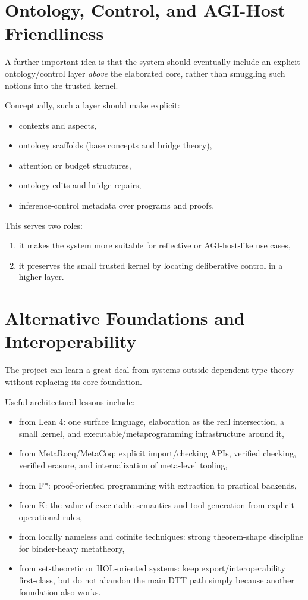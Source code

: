 \documentclass[11pt]{article}
\begin{document}
\section{Ontology, Control, and AGI-Host Friendliness}
A further important idea is that the system should eventually include an explicit ontology/control layer \emph{above} the elaborated core, rather than smuggling such notions into the trusted kernel.

Conceptually, such a layer should make explicit:
\begin{itemize}
  \item contexts and aspects,
  \item ontology scaffolds (base concepts and bridge theory),
  \item attention or budget structures,
  \item ontology edits and bridge repairs,
  \item inference-control metadata over programs and proofs.
\end{itemize}

This serves two roles:
\begin{enumerate}[label=(\roman*)]
  \item it makes the system more suitable for reflective or AGI-host-like use cases,
  \item it preserves the small trusted kernel by locating deliberative control in a higher layer.
\end{enumerate}

\section{Alternative Foundations and Interoperability}
The project can learn a great deal from systems outside dependent type theory without replacing its core foundation.

Useful architectural lessons include:
\begin{itemize}
  \item from Lean 4: one surface language, elaboration as the real intersection, a small kernel, and executable/metaprogramming infrastructure around it,
  \item from MetaRocq/MetaCoq: explicit import/checking APIs, verified checking, verified erasure, and internalization of meta-level tooling,
  \item from F*: proof-oriented programming with extraction to practical backends,
  \item from K: the value of executable semantics and tool generation from explicit operational rules,
  \item from locally nameless and cofinite techniques: strong theorem-shape discipline for binder-heavy metatheory,
  \item from set-theoretic or HOL-oriented systems: keep export/interoperability first-class, but do not abandon the main DTT path simply because another foundation also works.
\end{itemize}
\end{document}
